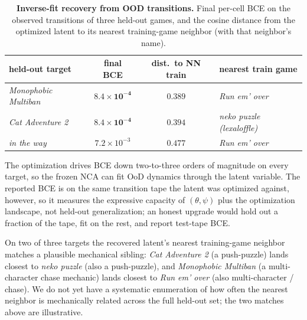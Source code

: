 \begin{table}[t]
  \centering
  \caption{\textbf{Inverse-fit recovery from OOD transitions.}
    Final per-cell BCE on the observed transitions of three
    held-out games, and the cosine distance from the optimized latent
    to its nearest training-game neighbor (with that neighbor's
    name).}
  \label{tab:inverse-fit}
  \small
  \begin{tabular}{l c c l}
    \toprule
    held-out target & final BCE & dist.\ to NN train & nearest train game \\
    \midrule
    \textit{Monophobic Multiban} & $\mathbf{8.4 \times 10^{-4}}$ & $0.389$ & \textit{Run em' over} \\
    \textit{Cat Adventure 2}     & $\mathbf{8.4 \times 10^{-4}}$ & $0.394$ & \textit{neko puzzle (lexaloffle)} \\
    \textit{in the way}          & $7.2 \times 10^{-3}$         & $0.477$ & \textit{Run em' over} \\
    \bottomrule
  \end{tabular}
\end{table}

The optimization drives BCE down two-to-three orders of magnitude on
every target, so the frozen NCA can fit OoD dynamics through the
latent variable. The reported BCE is on the same transition tape
the latent was optimized against, however, so it measures the
expressive capacity of $(\theta, \psi)$ plus the optimization
landscape, not held-out generalization; an honest upgrade would
hold out a fraction of the tape, fit on the rest, and report
test-tape BCE.

On two of three targets the recovered latent's nearest training-game
neighbor matches a plausible mechanical sibling:
\textit{Cat Adventure 2} (a push-puzzle) lands closest to
\textit{neko puzzle} (also a push-puzzle), and
\textit{Monophobic Multiban} (a multi-character chase mechanic)
lands closest to \textit{Run em' over} (also multi-character /
chase). We do not yet have a systematic enumeration of how often
the nearest neighbor is mechanically related across the full
held-out set; the two matches above are illustrative.
